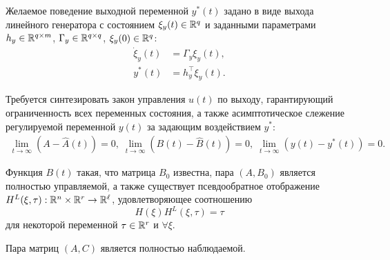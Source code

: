 \begin{frame} \hypertarget{slide\insertframenumber}{}
	Желаемое поведение выходной переменной $y^*(t)$ задано в виде выхода линейного генератора с состоянием $\xi_y(t)\in \mathbb{R}^q$ и заданными параметрами $h_y\in\mathbb{R}^{q\times m}$, $\Gamma_y \in\mathbb{R}^{q\times q}$, $\xi_y(0)\in \mathbb{R}^q$:
	\begin{align}\label{xi_star}
		\dot \xi_y(t)&=\Gamma_y\xi_y(t),\\
		\label{y_star}
		y^*(t)&=h_y^\top\xi_y(t).
	\end{align}
	
	Требуется синтезировать закон управления $u(t)$ по выходу,
	гарантирующий ограниченность всех переменных состояния, а также асимптотическое слежение регулируемой переменной $y(t)$ за задающим воздействием $y^*$:
	\begin{align}
		\label{goal}
		\mathop {\lim }\limits_{t \to \infty } \left( {A  - \hat A(t)} \right) = 0, \;
		\mathop {\lim }\limits_{t \to \infty } \left( {B(t)  - \hat B(t)} \right) = 0, \;
		\mathop {\lim }\limits_{t \to \infty } \left( {y(t)  - y^*(t)} \right) = 0.
	\end{align}
\end{frame}


\begin{frame} \hypertarget{slide\insertframenumber}{}
	\begin{assumption}
		\label{ass1}
		Функция $B(t)$ такая, что матрица $B_0$ известна, пара $(A,B_0)$ является полностью управляемой, а также существует псевдообратное отображение $H^L(\xi,\tau):\mathbb{R}^n\times\mathbb{R}^r\to\mathbb{R}^\ell$, удовлетворяющее соотношению
		\[	H\left(\xi\right)H^L(\xi,\tau)=\tau \]	
		для некоторой переменной $\tau\in\mathbb{R}^r$ и $\forall\xi$.
	\end{assumption}
	\begin{assumption}
		\label{ass2}
		Пара матриц $(A, C)$ является полностью наблюдаемой.
	\end{assumption}
\end{frame}